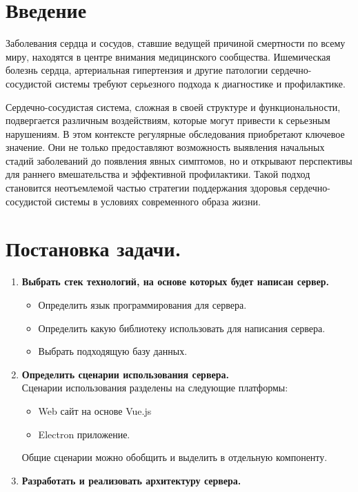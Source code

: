 \documentclass[12pt, russian]{extarticle}
\begin{document}
    \begin{spacing}{1.5}


    \tableofcontents
    \thispagestyle{empty}
    \newpage

    \pagestyle{plain}
    \setcounter{page}{3}

    \newpage
    \section{Введение}

    Заболевания сердца и сосудов, ставшие ведущей причиной смертности по всему миру,
    находятся в центре внимания медицинского сообщества. Ишемическая болезнь сердца,
    артериальная гипертензия и другие патологии сердечно-сосудистой системы требуют
    серьезного подхода к диагностике и профилактике.

    Сердечно-сосудистая система, сложная в своей структуре и функциональности,
    подвергается различным воздействиям, которые могут привести к серьезным нарушениям.
    В этом контексте регулярные обследования приобретают ключевое значение. Они не только
    предоставляют возможность выявления начальных стадий заболеваний до появления явных
    симптомов, но и открывают перспективы для раннего вмешательства и эффективной
    профилактики. Такой подход становится неотъемлемой частью стратегии поддержания
    здоровья сердечно-сосудистой системы в условиях современного образа жизни.

    \newpage
    \section{Постановка задачи.}

    \begin{enumerate}
        \item \textbf{Выбрать стек технологий, на основе которых будет написан сервер.}
            \begin{itemize}
                \item Определить язык программирования для сервера.
                \item Определить какую библиотеку использовать для написания сервера.
                \item Выбрать подходящую базу данных.
            \end{itemize}
        \item \textbf{Определить сценарии использования сервера.} \\
            Сценарии использования разделены на следующие платформы:
            \begin{itemize}
                \item Web сайт на основе Vue.js
                \item Electron приложение.
            \end{itemize}
            Общие сценарии можно обобщить и выделить в отдельную компоненту.
        \item \textbf{Разработать и реализовать архитектуру сервера.}
    \end{enumerate}


\end{spacing}
\end{document}
